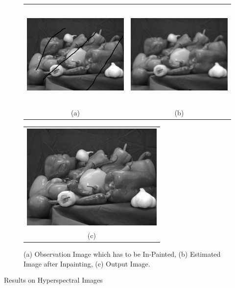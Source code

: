 \documentclass[a4paper, 15pt]{article}
\begin{document}
	\begin{figure}[!h]
		\centering 
		\begin{tabular}{cc}
			\includegraphics[width=7cm, height=5.3cm]{observationGMRF.png} &\hspace{-8pt}
			\includegraphics[width=7cm, height=5.3cm]{ssimSimpleRec.png}\\
			(a) & (b) \\
		\end{tabular}
		\begin{tabular}{c}
			\includegraphics[width=7cm, height=5.3cm]{bestOutGMRF.png}\\ 
			(c)
		\end{tabular}
		\caption{(a) Observation Image which has to be In-Painted, (b) Estimated Image after Inpainting, (c) Output Image.}
	\end{figure}
	\newpage
	\begin{center}
		{\fontsize{20}{30}\selectfont Results on Hyperspectral Images}\
	\end{center}
\end{document}
